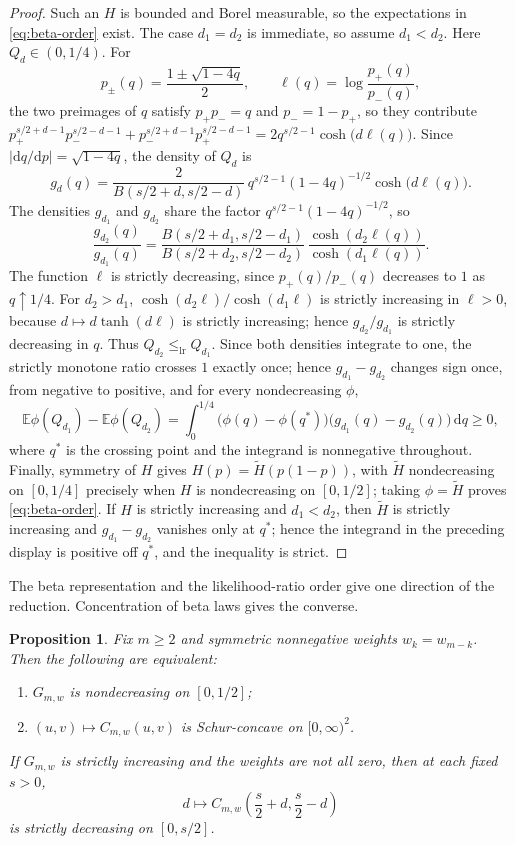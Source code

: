 \documentclass[11pt,a4paper]{amsart}
\numberwithin{equation}{section}
\theoremstyle{plain}
\newtheorem{proposition}[theorem]{Proposition}
\theoremstyle{definition}
\newcommand{\E}{\mathbb E}
\begin{document}
\begin{proof}
Such an \(H\) is bounded and Borel measurable, so the expectations in
\eqref{eq:beta-order} exist.  The case \(d_1=d_2\) is immediate, so assume
\(d_1<d_2\).  Here
\(Q_d\in(0,1/4)\).  For
\[
 p_\pm(q)=\frac{1\pm\sqrt{1-4q}}{2},
 \qquad
 \ell(q)=\log\frac{p_+(q)}{p_-(q)},
\]
the two preimages of \(q\) satisfy \(p_+p_-=q\) and \(p_-=1-p_+\), so they contribute
\(p_+^{s/2+d-1}p_-^{s/2-d-1}+p_-^{s/2+d-1}p_+^{s/2-d-1}
 =2q^{s/2-1}\cosh\bigl(d\ell(q)\bigr)\).  Since
\(|\mathrm dq/\mathrm dp|=\sqrt{1-4q}\), the density of \(Q_d\) is
\[
 g_d(q)=\frac{2}{B(s/2+d,s/2-d)}\,
 q^{s/2-1}(1-4q)^{-1/2}\cosh\!\bigl(d\ell(q)\bigr).
\]
The densities \(g_{d_1}\) and \(g_{d_2}\) share the factor
\(q^{s/2-1}(1-4q)^{-1/2}\), so
\[
 \frac{g_{d_2}(q)}{g_{d_1}(q)}
 =\frac{B(s/2+d_1,s/2-d_1)}{B(s/2+d_2,s/2-d_2)}\,
  \frac{\cosh(d_2\ell(q))}{\cosh(d_1\ell(q))}.
\]
The function \(\ell\) is strictly decreasing, since \(p_+(q)/p_-(q)\) decreases to
\(1\) as \(q\uparrow1/4\).  For \(d_2>d_1\), \(\cosh(d_2\ell)/\cosh(d_1\ell)\) is
strictly increasing in \(\ell>0\), because \(d\mapsto d\tanh(d\ell)\) is strictly
increasing; hence \(g_{d_2}/g_{d_1}\) is strictly decreasing in \(q\).  Thus \(Q_{d_2}\le_{\mathrm{lr}}Q_{d_1}\).  Since both densities integrate to one,
the strictly monotone ratio crosses \(1\) exactly once; hence
\(g_{d_1}-g_{d_2}\) changes sign once, from negative to positive, and for every
nondecreasing \(\phi\),
\[
 \E\phi(Q_{d_1})-\E\phi(Q_{d_2})
 =\int_0^{1/4}\bigl(\phi(q)-\phi(q^\ast)\bigr)
   \bigl(g_{d_1}(q)-g_{d_2}(q)\bigr)\,\mathrm d q\ge0,
\]
where \(q^\ast\) is the crossing point and the integrand is nonnegative
throughout.  Finally, symmetry of \(H\) gives \(H(p)=\widetilde H(p(1-p))\), with
\(\widetilde H\) nondecreasing on \([0,1/4]\) precisely when \(H\) is nondecreasing
on \([0,1/2]\); taking \(\phi=\widetilde H\) proves \eqref{eq:beta-order}.  If \(H\)
is strictly increasing and \(d_1<d_2\), then \(\widetilde H\) is strictly increasing
and \(g_{d_1}-g_{d_2}\) vanishes only at \(q^\ast\); hence the integrand in the
preceding display is positive off \(q^\ast\), and the inequality is strict.
\end{proof}

The beta representation and the likelihood-ratio order give one direction of the
reduction.  Concentration of beta laws gives the converse.

\begin{proposition}\label{prop:kernel-exact}
Fix \(m\ge2\) and symmetric nonnegative weights \(w_k=w_{m-k}\).  Then the
following are equivalent:
\begin{enumerate}
\item \(G_{m,w}\) is nondecreasing on \([0,1/2]\);
\item \((u,v)\mapsto C_{m,w}(u,v)\) is Schur-concave on
\([0,\infty)^2\).
\end{enumerate}
If \(G_{m,w}\) is strictly increasing and the weights are not all zero, then at
each fixed \(s>0\),
\[
 d\longmapsto C_{m,w}\left(\frac s2+d,\frac s2-d\right)
\]
is strictly decreasing on \([0,s/2]\).
\end{proposition}
\end{document}
